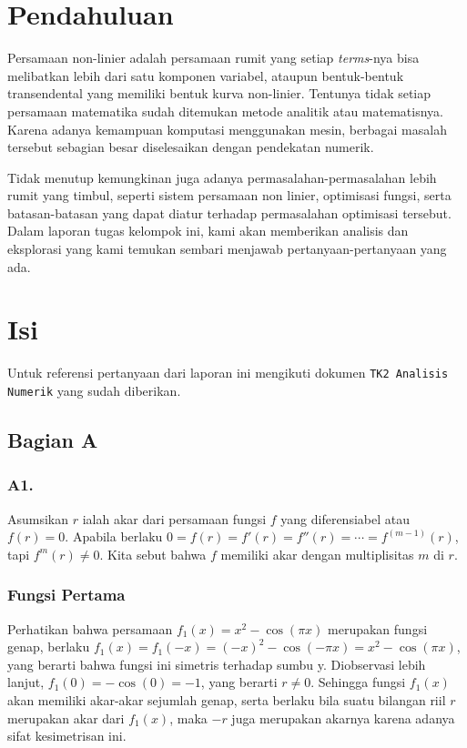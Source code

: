 \documentclass[11pt, a4paper, onecolumn, oneside, final]{report}
\begin{document}
\section*{Pendahuluan}

Persamaan non-linier adalah persamaan rumit yang setiap \textit{terms}-nya bisa melibatkan lebih dari satu komponen variabel, ataupun bentuk-bentuk transendental yang memiliki bentuk kurva non-linier. Tentunya tidak setiap persamaan matematika sudah ditemukan metode analitik atau matematisnya. Karena adanya kemampuan komputasi menggunakan mesin, berbagai masalah tersebut sebagian besar diselesaikan dengan pendekatan numerik.

Tidak menutup kemungkinan juga adanya permasalahan-permasalahan lebih rumit yang timbul, seperti sistem persamaan non linier, optimisasi fungsi, serta batasan-batasan yang dapat diatur terhadap permasalahan optimisasi tersebut. Dalam laporan tugas kelompok ini, kami akan memberikan analisis dan eksplorasi yang kami temukan sembari menjawab pertanyaan-pertanyaan yang ada.

\section*{Isi}
Untuk referensi pertanyaan dari laporan ini mengikuti dokumen \texttt{TK2 Analisis Numerik} yang sudah diberikan. 

\subsection*{Bagian A}
\subsubsection*{A1.}

Asumsikan $r$ ialah akar dari persamaan fungsi $f$ yang diferensiabel atau $f(r) = 0$. Apabila berlaku $0 = f(r) = f'(r) = f''(r) = \cdots = f^{(m-1)}(r)$, tapi $f^{m}(r) \ne 0$. Kita sebut bahwa $f$ memiliki akar dengan multiplisitas $m$ di $r$.\\

\subsubsection*{Fungsi Pertama}

Perhatikan bahwa persamaan $f_1(x) = x^2 - \cos(\pi x)$ merupakan fungsi genap, berlaku $f_1(x) = f_1(-x) = (-x)^2 - \cos(-\pi x) = x^2 - \cos(\pi x)$, yang berarti bahwa fungsi ini simetris terhadap sumbu y. Diobservasi lebih lanjut, $f_1(0) = -\cos(0) = -1$, yang berarti $r \ne 0$. Sehingga fungsi $f_1(x)$ akan memiliki akar-akar sejumlah genap, serta berlaku bila suatu bilangan riil $r$ merupakan akar dari $f_1(x)$, maka $-r$ juga merupakan akarnya karena adanya sifat kesimetrisan ini.
\end{document}
